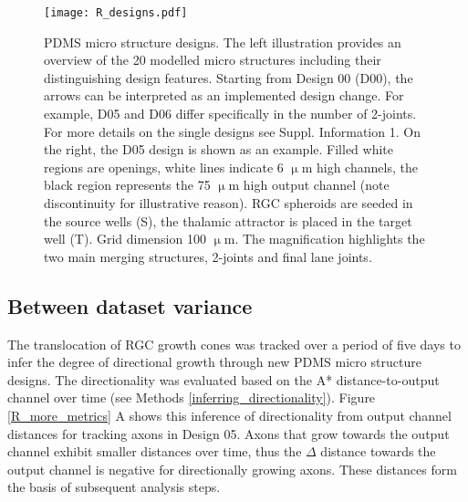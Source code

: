 \begin{figure}[h!]
    \texttt{[image: R\_designs.pdf]}
    \caption[PDMS micro structure designs]
        {PDMS micro structure designs. The left illustration provides an
        overview of the 20 modelled micro structures including their
        distinguishing design features. Starting from Design 00 (D00), the arrows
        can be interpreted as an implemented design change. For example, D05 and
        D06 differ specifically in the number of 2-joints. For more details on
        the single designs see Suppl. Information 1. On the right, the D05 design is
        shown as an example. Filled white regions are openings, white lines
        indicate 6 $\upmu$m high channels, the black region represents the 75
        $\upmu$m high output channel (note discontinuity for illustrative
        reason). RGC spheroids are seeded in the source wells (S), the thalamic
        attractor is placed in the target well (T). Grid dimension 100 $\upmu$m.
        The magnification highlights the two main merging structures, 2-joints
        and final lane joints.} 
    \label{R_designs}
\end{figure}


\subsection{Between dataset variance}
The translocation of RGC growth cones was tracked over a period of five days to
infer the degree of directional growth through new PDMS micro structure designs.
The directionality was evaluated based on the A* distance-to-output channel over
time (see Methods \ref{inferring_directionality}). Figure \ref{R_more_metrics} A
shows this inference of directionality from output channel distances for
tracking axons in Design 05. Axons that grow towards the output channel exhibit
smaller distances over time, thus the $\Delta$ distance towards the output
channel is negative for directionally growing axons. These distances form the 
basis of subsequent analysis steps.\\

